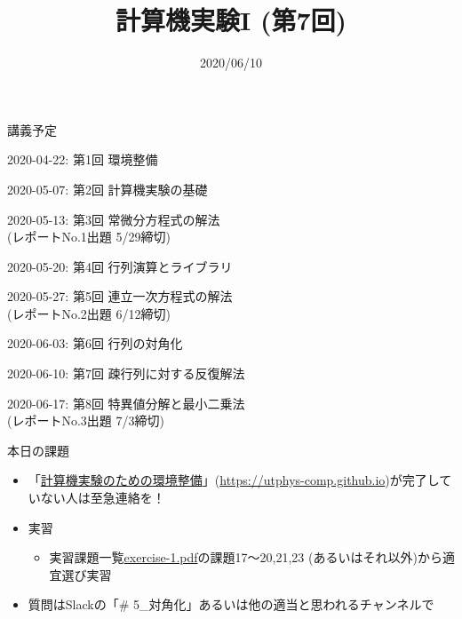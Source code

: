 \documentclass[10pt,dvipdfmx]{beamer}
\title{計算機実験I (第7回)}
\date{2020/06/10}
\begin{document}
\begin{frame}
  \titlepage
  \tableofcontents
\end{frame}

\begin{frame}[t]{講義予定}
  \begin{itemize}
  {\color{gray} \item 2020-04-22: 第1回 環境整備}
  {\color{gray} \item 2020-05-07: 第2回 計算機実験の基礎}
  {\color{gray} \item 2020-05-13: 第3回 常微分方程式の解法 \\
    \hspace*{5em} (レポートNo.1出題 5/29締切)}
  {\color{gray} \item 2020-05-20: 第4回 行列演算とライブラリ}
  {\color{gray} \item 2020-05-27: 第5回 連立一次方程式の解法 \\
  \hspace*{5em} (レポートNo.2出題 6/12締切)}
  {\color{gray} \item 2020-06-03: 第6回 行列の対角化}
\item 2020-06-10: 第7回 疎行列に対する反復解法
\item 2020-06-17: 第8回 特異値分解と最小二乗法 \\
  \hspace*{5em} (レポートNo.3出題 7/3締切)
  \end{itemize}
\end{frame}

\begin{frame}[t]{本日の課題}
  \begin{itemize}
  \item 「\href{https://utphys-comp.github.io}{計算機実験のための環境整備}」({\small \href{https://utphys-comp.github.io}{https://utphys-comp.github.io}})が完了していない人は至急連絡を！
  \item 実習
    \begin{itemize}
    \item 実習課題一覧\href{https://github.com/todo-group/ComputerExperiments/releases/tag/2020s-computer1}{exercise-1.pdf}の課題17〜20,21,23 (あるいはそれ以外)から適宜選び実習
    \end{itemize}
  \item 質問はSlackの「\# 5\_対角化」あるいは他の適当と思われるチャンネルで \\[2em]
  \end{itemize}
\end{frame}
\end{document}
